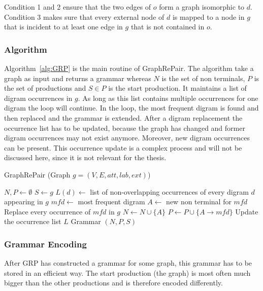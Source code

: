 Condition 1 and 2 ensure that the two edges of $o$ form a graph isomorphic to $d$. Condition 3 makes sure that every external node of $d$ is mapped to a node in $g$ that is incident to at least one edge in $g$ that is not contained in $o$.~\cite{maneth}

\subsubsection{Algorithm}

Algorithm~\ref{alg:GRP} is the main routine of GraphRePair. The algorithm take a graph as input and returns a grammar whereas $N$ is the set of non terminals, $P$ is the set of productions and $S \in P$ is the start production. It maintains a list of digram occurrences in $g$. As long as this list contains multiple occurrences for one digram the loop will continue. In the loop, the most frequent digram is found and then replaced and the grammar is extended. After a digram replacement the occurrence list has to be updated, because the graph has changed and former digram occurrences may not exist anymore. Moreover, new digram occurrences can be present. This occurrence update is a complex process and will not be discussed here, since it is not relevant for the thesis.~\cite{maneth}

\begin{algorithm}
	\caption{GraphRePair (Graph $g=(V,E,att,lab,ext)$)}\label{alg:GRP}
	\begin{algorithmic}[1]
		\State $ N,P\leftarrow \emptyset$
		\State $S \leftarrow g$
		\State $L(d) \leftarrow $ list of non-overlapping occurrences of every digram $d$ appearing in $g$
			\State $mfd \leftarrow$ most frequent digram
			\State $A \leftarrow$ new non terminal for $mfd$
			\State Replace every occurrence of $mfd$ in $g$
			\State $N \leftarrow N \cup \{A\}$
			\State $P\leftarrow P\cup \{A \to mfd \}$
			\State Update the occurrence list $L$
		\EndWhile
		\State \Return Grammar $(N,P,S)$
	\end{algorithmic}
\end{algorithm}


\subsubsection{Grammar Encoding}

After GRP has constructed a grammar for some graph, this grammar has to be stored in an efficient way. The start production (the graph) is most often much bigger than the other productions and is therefore encoded differently. 

